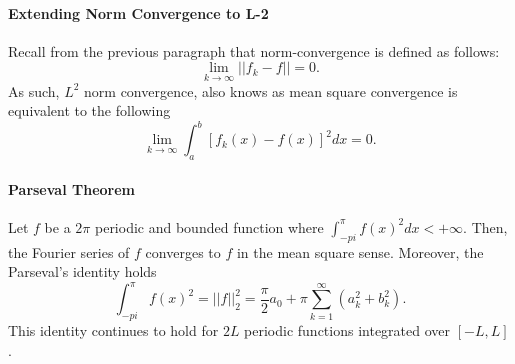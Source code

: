 \paragraph{Extending Norm Convergence to L-2}
Recall from the previous paragraph that norm-convergence is defined as follows:
\[\lim_{k\to\infty} ||f_k - f|| = 0.\]
As such, \(L^2\) norm convergence, also knows as mean square convergence
is equivalent to the following
\[\lim_{k\to\infty} \int_a^b [f_k(x)-f(x)]^2 dx = 0.\]

\paragraph{Parseval Theorem}
Let \(f\) be a \(2\pi\) periodic and bounded function where
\(\int_{-pi}^\pi f(x)^2 dx < +\infty\). Then, the Fourier series of \(f\) converges to \(f\) in the mean square sense. Moreover, the Parseval's
identity holds
\[
\int_{-pi}^\pi f(x)^2 = ||f||_2^2 = \frac{\pi}{2}a_0 +
\pi \sum_{k=1}^\infty  (a_k^2 +b_k^2).
\]
This identity continues to hold for \(2L\) periodic functions integrated
over \([-L, L]\).

